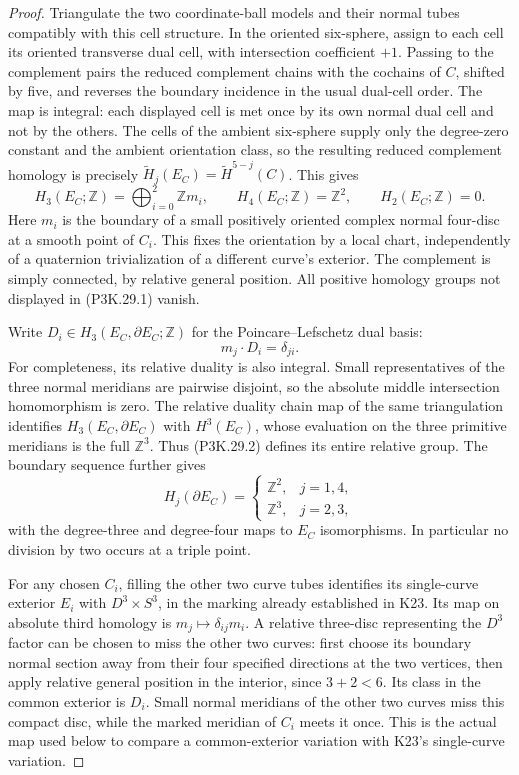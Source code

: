 \begin{proof}
Triangulate the two coordinate-ball models and their
normal tubes compatibly with this cell structure.
In the oriented six-sphere, assign to each cell its
oriented transverse dual cell, with intersection
coefficient \(+1\). Passing to the complement pairs the
reduced complement chains with the cochains of \(C\),
shifted by five, and reverses the boundary incidence
in the usual dual-cell order. The map is integral:
each displayed cell is met once by its own normal
dual cell and not by the others. The cells of the
ambient six-sphere supply only the degree-zero
constant and the ambient orientation class, so the
resulting reduced complement homology is precisely
\(\widetilde H_j(E_C)=\widetilde H^{5-j}(C)\).
This gives
\[
 H_3(E_C;\mathbb Z)=\bigoplus_{i=0}^2\mathbb Z m_i,\qquad
 H_4(E_C;\mathbb Z)=\mathbb Z^2,\qquad H_2(E_C;\mathbb Z)=0.
                                                        \tag{P3K.29.1}
\]
Here \(m_i\) is the boundary of a small positively oriented complex
normal four-disc at a smooth point of \(C_i\). This fixes the
orientation by a local chart, independently of a quaternion
trivialization of a different curve's exterior. The complement is
simply connected, by relative general position. All positive
homology groups not displayed in (P3K.29.1) vanish.

Write \(D_i\in H_3(E_C,\partial E_C;\mathbb Z)\) for the
Poincare--Lefschetz dual basis:
\[
                    m_j\cdot D_i=\delta_{ji}.
                                                        \tag{P3K.29.2}
\]
For completeness, its relative duality is also integral.
Small representatives of the three normal meridians
are pairwise disjoint, so the absolute middle
intersection homomorphism is zero. The relative
duality chain map of the same triangulation identifies
\(H_3(E_C,\partial E_C)\) with \(H^3(E_C)\), whose
evaluation on the three primitive meridians is the
full \(\mathbb Z^3\). Thus (P3K.29.2) defines its entire
relative group. The boundary sequence further gives
\[
 H_j(\partial E_C)=
 \begin{cases}
  \mathbb Z^2,&j=1,4,\\
  \mathbb Z^3,&j=2,3,
 \end{cases}
\]
with the degree-three and degree-four maps to \(E_C\)
isomorphisms. In particular no division by two occurs
at a triple point.

For any chosen \(C_i\), filling the other two curve tubes identifies
its single-curve exterior \(E_i\) with \(D^3\times S^3\), in the
marking already established in K23. Its map on absolute third
homology is \(m_j\mapsto\delta_{ij}m_i\). A relative three-disc
representing the \(D^3\) factor can be chosen to miss the other two
curves: first choose its boundary normal section away from their
four specified directions at the two vertices, then apply relative
general position in the interior, since \(3+2<6\).
Its class in the common exterior is \(D_i\). Small normal
meridians of the other two curves miss this compact disc, while
the marked meridian of \(C_i\) meets it once. This is the actual
map used below to compare a common-exterior variation with K23's
single-curve variation.


\end{proof}
